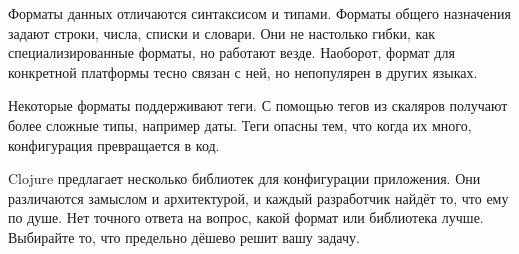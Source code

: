 Форматы данных отличаются синтаксисом и типами. Форматы общего назначения задают
строки, числа, списки и словари. Они не настолько гибки, как специализированные
форматы, но работают везде. Наоборот, формат для конкретной платформы тесно
связан с ней, но непопулярен в других языках.

Некоторые форматы поддерживают теги. С помощью тегов из скаляров получают более
сложные типы, например даты. Теги опасны тем, что когда их много, конфигурация
превращается в код.

Clojure предлагает несколько библиотек для конфигурации приложения. Они
различаются замыслом и архитектурой, и каждый разработчик найдёт то, что ему по
душе. Нет точного ответа на вопрос, какой формат или библиотека лучше. Выбирайте
то, что предельно дёшево решит вашу задачу.
